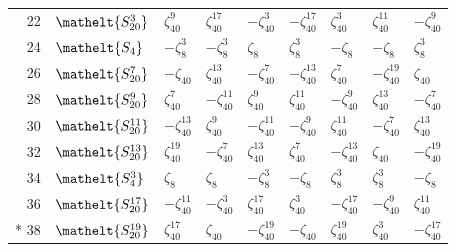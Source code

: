 \documentclass[10pt,a4paper]{article}
\numberwithin{equation}{section}
\newcommand{\eltfont}[1]{{\let\sigma\eltsigma\mathelt{#1}}}
\newcommand{\cls}[1]{\eltfont{#1}}
\newcommand{\rootunity}[1]{\zeta_{#1}}
\begin{document}
{\begin{longtable}{@{}rllllllll@{}}
22 & $\cls{S_{20}^{3}}$ & $\rootunity{40}^{9}$ & $\rootunity{40}^{17}$ & $-\rootunity{40}^{3}$ & $-\rootunity{40}^{17}$ & $\rootunity{40}^{3}$ & $\rootunity{40}^{11}$ & $-\rootunity{40}^{9}$\\
24 & $\cls{S_{4}}$ & $-\rootunity{8}^{3}$ & $-\rootunity{8}^{3}$ & $\rootunity{8}$ & $\rootunity{8}^{3}$ & $-\rootunity{8}$ & $-\rootunity{8}$ & $\rootunity{8}^{3}$\\
26 & $\cls{S_{20}^{7}}$ & $-\rootunity{40}$ & $\rootunity{40}^{13}$ & $-\rootunity{40}^{7}$ & $-\rootunity{40}^{13}$ & $\rootunity{40}^{7}$ & $-\rootunity{40}^{19}$ & $\rootunity{40}$\\
28 & $\cls{S_{20}^{9}}$ & $\rootunity{40}^{7}$ & $-\rootunity{40}^{11}$ & $\rootunity{40}^{9}$ & $\rootunity{40}^{11}$ & $-\rootunity{40}^{9}$ & $\rootunity{40}^{13}$ & $-\rootunity{40}^{7}$\\
30 & $\cls{S_{20}^{11}}$ & $-\rootunity{40}^{13}$ & $\rootunity{40}^{9}$ & $-\rootunity{40}^{11}$ & $-\rootunity{40}^{9}$ & $\rootunity{40}^{11}$ & $-\rootunity{40}^{7}$ & $\rootunity{40}^{13}$\\
32 & $\cls{S_{20}^{13}}$ & $\rootunity{40}^{19}$ & $-\rootunity{40}^{7}$ & $\rootunity{40}^{13}$ & $\rootunity{40}^{7}$ & $-\rootunity{40}^{13}$ & $\rootunity{40}$ & $-\rootunity{40}^{19}$\\
34 & $\cls{S_{4}^{3}}$ & $\rootunity{8}$ & $\rootunity{8}$ & $-\rootunity{8}^{3}$ & $-\rootunity{8}$ & $\rootunity{8}^{3}$ & $\rootunity{8}^{3}$ & $-\rootunity{8}$\\
36 & $\cls{S_{20}^{17}}$ & $-\rootunity{40}^{11}$ & $-\rootunity{40}^{3}$ & $\rootunity{40}^{17}$ & $\rootunity{40}^{3}$ & $-\rootunity{40}^{17}$ & $-\rootunity{40}^{9}$ & $\rootunity{40}^{11}$\\*
38 & $\cls{S_{20}^{19}}$ & $\rootunity{40}^{17}$ & $\rootunity{40}$ & $-\rootunity{40}^{19}$ & $-\rootunity{40}$ & $\rootunity{40}^{19}$ & $\rootunity{40}^{3}$ & $-\rootunity{40}^{17}$\\
\bottomrule\end{longtable}}
\end{document}
